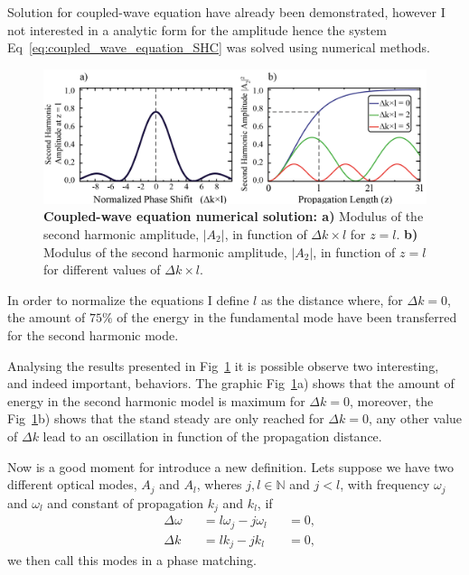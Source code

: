 Solution for coupled-wave equation have already been demonstrated, however I not interested in a analytic form for the amplitude hence the system Eq~\ref{eq:coupled_wave_equation_SHC} was solved using numerical methods.

\begin{figure}[h!]
    \centering
    \includegraphics[width = 16cm]{figuras/Dissertation_coppled_eq_sol.jpg}
    \caption{\textbf{Coupled-wave equation numerical solution: a)} Modulus of the second harmonic amplitude, $|A_2|$, in function of $\Delta k \times l$ for $z = l$. \textbf{b)} Modulus of the second harmonic amplitude, $|A_2|$, in function of $z = l$ for different values of $\Delta k \times l$.}
    \label{fig:model_solution}
\end{figure}

In order to normalize the equations I define $l$ as the distance where, for $\Delta k = 0$, the amount of $75\%$ of the energy in the fundamental mode have been transferred for the second harmonic mode. 

Analysing the results presented in Fig~\ref{fig:model_solution} it is possible observe two interesting, and indeed important, behaviors. The graphic Fig~\ref{fig:model_solution}a) shows that the amount of energy in the second harmonic model is maximum for $\Delta k = 0$, moreover, the Fig~\ref{fig:model_solution}b) shows that the stand steady are only reached for $\Delta k = 0$, any other value of $\Delta k$ lead to an oscillation in function of the propagation distance.

Now is a good moment for introduce a new definition. Lets suppose we have two different optical modes, $A_j$ and $A_l$, wheres $j,l \in \mathbb{N} $ and $j<l$, with frequency $\omega_j$ and $\omega_l$ and constant of propagation $k_j$ and $k_l$, if
\begin{subequations}  
    \begin{alignat}{3}
        &\Delta\omega &&= l \omega_j - j \omega_l & &= 0,\\
        &\Delta k &&= l k_j - j k_l & &= 0,
    \label{eq:phase_matc}
    \end{alignat}
\end{subequations}  
we then call this modes in a phase matching.

